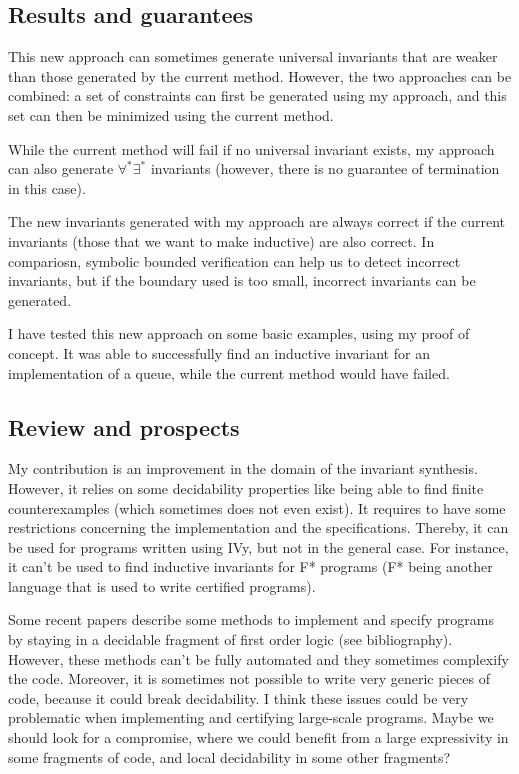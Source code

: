 \documentclass{article}
\newenvironment{point}[1]%
{\subsection*{#1}}%
{}
\begin{document}
\begin{point}{Results and guarantees}

  This new approach can sometimes generate universal invariants that are weaker than those generated by the current
  method. However, the two approaches can be combined: a set of constraints can first be generated using my approach,
  and this set can then be minimized using the current method.

  While the current method will fail if no universal invariant exists,
  my approach can also generate \(\forall^*\exists^*\) invariants (however, there is no guarantee of termination in this case).

  The new invariants generated with my approach are always correct if the current invariants (those that we want to make inductive)
  are also correct. In compariosn, symbolic bounded verification can help us to detect incorrect invariants, but if the boundary used is too small,
  incorrect invariants can be generated.

  I have tested this new approach on some basic examples, using my proof of concept.
  It was able to successfully find an inductive invariant for an implementation of a queue,
  while the current method would have failed.

\end{point}


\begin{point}{Review and prospects}

  My contribution is an improvement in the domain of the invariant synthesis.
  However, it relies on some decidability properties like being able to find finite counterexamples (which sometimes does not even exist).
  It requires to have some restrictions concerning the implementation and the specifications.
  Thereby, it can be used for programs written using IVy, but not in the general case.
  For instance, it can't be used to find inductive invariants for F* programs (F* being another language that is used to write certified programs).
  
  Some recent papers describe some methods to implement and specify programs by staying in a decidable fragment of first order logic (see bibliography).
  However, these methods can't be fully automated and they sometimes complexify the code. Moreover, it is sometimes not possible
  to write very generic pieces of code, because it could break decidability.
  I think these issues could be very problematic when implementing and certifying large-scale programs.
  Maybe we should look for a compromise, where we could benefit from a large expressivity in some fragments of code, and local decidability in some other fragments?

\end{point}
\end{document}
